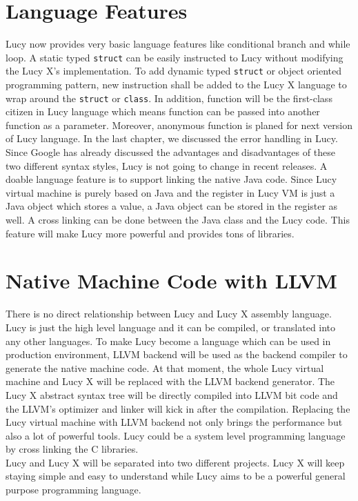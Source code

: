 \section{Language Features}
Lucy now provides very basic language features like conditional branch and while loop. A static typed \texttt{struct} can be easily instructed to Lucy without modifying the Lucy X's implementation. To add dynamic typed \texttt{struct} or object oriented programming pattern, new instruction shall be added to the Lucy X language to wrap around the \texttt{struct} or \texttt{class}. In addition, function will be the first-class citizen in Lucy language which means function can be passed into another function as a parameter. Moreover, anonymous function is planed for next version of Lucy language.
In the last chapter, we discussed the error handling in Lucy. Since Google has already discussed the advantages and disadvantages of these two different syntax styles, Lucy is not going to change in recent releases.
A doable language feature is to support linking the native Java code. Since Lucy virtual machine is purely based on Java and the register in Lucy VM is just a Java object which stores a value, a Java object can be stored in the register as well. A cross linking can be done between the Java class and the Lucy code. This feature will make Lucy more powerful and provides tons of libraries.


\section{Native Machine Code with LLVM}
There is no direct relationship between Lucy and Lucy X assembly language. Lucy is just the high level language and it can be compiled, or translated into any other languages. To make Lucy become a language which can be used in production environment, LLVM backend will be used as the backend compiler to generate the native machine code. At that moment, the whole Lucy virtual machine and Lucy X will be replaced with the LLVM backend generator. The Lucy X abstract syntax tree will be directly compiled into LLVM bit code and the LLVM's optimizer and linker will kick in after the compilation. Replacing the Lucy virtual machine with LLVM backend not only brings the performance but also a lot of powerful tools. Lucy could be a system level programming language by cross linking the C libraries. \\
Lucy and Lucy X will be separated into two different projects. Lucy X will keep staying simple and easy to understand while Lucy aims to be a powerful general purpose programming language.
